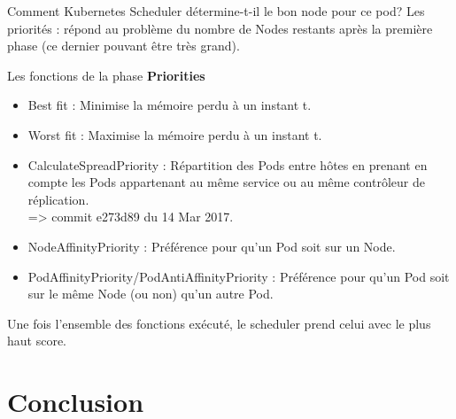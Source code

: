 \documentclass{bredelebeamer}
\begin{document}
\begin{frame}{Comment Kubernetes Scheduler détermine-t-il le bon node pour ce pod?}
Les priorités : répond au problème du nombre de Nodes restants après la première phase (ce dernier pouvant être très grand).
\begin{block}{Les fonctions de la phase \textbf{Priorities}}
\begin{itemize}
\item Best fit : Minimise la mémoire perdu à un instant t.\pause
\item Worst fit : Maximise la mémoire perdu à un instant t.\pause
\item CalculateSpreadPriority : Répartition des Pods entre hôtes en prenant en compte les Pods appartenant au même service ou au même contrôleur de réplication. \\
=> commit e273d89 du 14 Mar 2017.\pause
\item NodeAffinityPriority : Préférence pour qu'un Pod soit sur un Node.\pause
\item PodAffinityPriority/PodAntiAffinityPriority : Préférence pour qu'un Pod soit sur le même Node (ou non) qu'un autre Pod.
\end{itemize}
\end{block}
Une fois l'ensemble des fonctions exécuté, le scheduler prend celui avec le plus haut score.
\end{frame}

\section{Conclusion}
\end{document}
